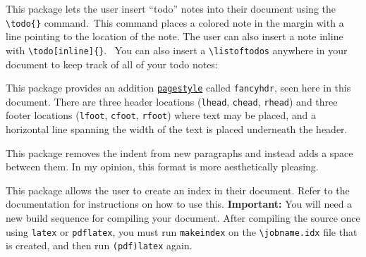 \documentclass[letterpaper,12pt]{article}
\begin{document}
\begin{description}[align=margin,labelsep=0pt,leftmargin=0pt,style=multiline,labelwidth=63pt]
{}
\item[\href{http://mirrors.concertpass.com/tex-archive/macros/latex/contrib/todonotes/todonotes.pdf}{\texttt{todonotes}}] This package lets the user insert ``todo'' notes into their document using the \verb|\todo{}| command.\ This command places a colored note in the margin with a line pointing to the location of the note. The user can also insert a note inline with \verb|\todo[inline]{}|. \ You can also insert a \verb|\listoftodos| anywhere in your document to keep track of all of your todo notes:
\begin{shaded*}
\listoftodos
\end{shaded*}


{}
\item[\href{http://ctan.mirrorcatalogs.com/macros/latex/contrib/fancyhdr/fancyhdr.pdf}{\texttt{fancyhdr}}] This package provides an addition \href{https://en.wikibooks.org/wiki/LaTeX/Page_Layout#Page_styles}{\texttt{pagestyle}} called \texttt{fancyhdr}, seen here in this document. There are three header locations (\texttt{lhead}, \texttt{chead}, \texttt{rhead}) and three footer locations (\texttt{lfoot}, \texttt{cfoot}, \texttt{rfoot}) where text may be placed, and a horizontal line spanning the width of the text is placed underneath the header.


{}
\item[\href{http://mirror.hmc.edu/ctan/macros/latex/contrib/parskip/parskip-doc.pdf}{\texttt{parskip}}]
 This package removes the indent from new paragraphs and instead adds a space 
between them. In my opinion, this format is more aesthetically pleasing.


{}
\item[\href{http://ctan.math.washington.edu/tex-archive/macros/latex/contrib/imakeidx/imakeidx.pdf}{\texttt{imakeidx}}]
This package allows the user to create an index in their document. Refer to the 
documentation for instructions on how to use this. \textbf{Important:} You will 
need a new build sequence for compiling your document. After compiling the 
source once using \texttt{latex} or \texttt{pdflatex}, you must run 
\texttt{makeindex} on the \verb|\jobname.idx| file that is created, and then 
run \texttt{(pdf)latex} again.



\end{description}
\end{document}

